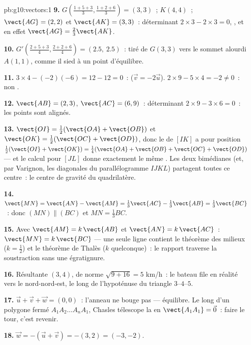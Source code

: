 \begin{solution}{pb:g10:vectors:1}
\textbf{9.} $G\left(\frac{1+5+3}{3}, \frac{1+2+6}{3}\right) =
(3, 3)$~; $K(4, 4)$~; $\vect{AG} = (2, 2)$ et
$\vect{AK} = (3, 3)$~: déterminant
$2 \times 3 - 2 \times 3 = 0$, , et en effet
$\vect{AG} = \frac23\vect{AK}$.

\textbf{10.} $G'\left(\frac{2 + 5 + 3}{4}, \frac{2 + 2 +
6}{4}\right) = (2.5,\ 2.5)$~: tiré de $G(3,3)$ vers le sommet alourdi
$A(1,1)$, comme il sied à un point d'équilibre.

\textbf{11.} $3 \times 4 - (-2)(-6) = 12 - 12 = 0$~: 
($\vec v = -2\vec u$). $2 \times 9 - 5 \times 4 = -2 \neq 0$~: non
.

\textbf{12.} $\vect{AB} = (2, 3)$, $\vect{AC} = (6, 9)$~:
déterminant $2 \times 9 - 3 \times 6 = 0$~: les points sont alignés.

\textbf{13.} $\vect{OI} = \frac12(\vect{OA} + \vect{OB})$ et
$\vect{OK} = \frac12(\vect{OC} + \vect{OD})$, donc le  de
$[IK]$ a pour  position
$\frac12(\vect{OI} + \vect{OK}) = \frac14(\vect{OA} +
\vect{OB} + \vect{OC} + \vect{OD})$ --- et le calcul pour $[JL]$
donne exactement le même . Les deux bimédianes (et, par
Varignon, les diagonales du parallélogramme $IJKL$) partagent toutes
ce centre~: le centre de gravité du quadrilatère.

\textbf{14.} $\vect{MN} = \vect{AN} - \vect{AM} =
\frac13\vect{AC} - \frac13\vect{AB} = \frac13\vect{BC}$~: donc
$(MN) \parallel (BC)$ et $MN = \frac13 BC$.

\textbf{15.} Avec $\vect{AM} = k\,\vect{AB}$ et
$\vect{AN} = k\,\vect{AC}$~: $\vect{MN} = k\,\vect{BC}$ --- une seule
ligne contient le théorème des milieux ($k = \frac12$) et le
théorème de Thalès ($k$ quelconque)~: le rapport traverse la
soustraction sans une égratignure.

\textbf{16.} Résultante $(3, 4)$, de norme $\sqrt{9 + 16} = 5$ km/h~:
le bateau file en réalité vers le nord-nord-est, le long de
l'hypoténuse du triangle $3$--$4$--$5$.

\textbf{17.} $\vec u + \vec v + \vec w = (0, 0)$~: l'anneau ne bouge
pas --- équilibre. Le long d'un polygone fermé
$A_1 A_2 \dots A_n A_1$, Chasles télescope la  en
$\vect{A_1 A_1} = \vec 0$~: faire le tour, c'est revenir.

\textbf{18.} $\vec w = -(\vec u + \vec v) = -(3, 2) = (-3, -2)$.


\end{solution}
